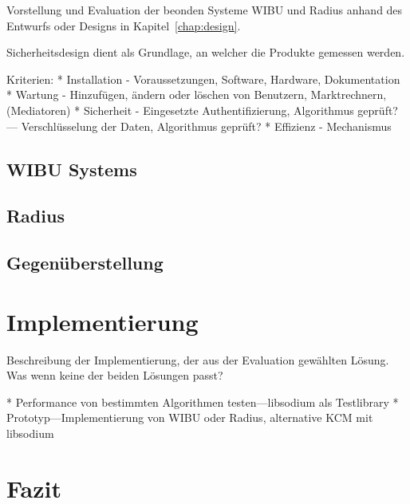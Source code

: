 \documentclass[11pt,a4paper]{report}
\begin{document}
Vorstellung und Evaluation der beonden Systeme WIBU und Radius anhand des Entwurfs oder Designs in Kapitel~\ref{chap:design}.

Sicherheitsdesign dient als Grundlage, an welcher die Produkte gemessen werden.

Kriterien:
* Installation - Voraussetzungen, Software, Hardware, Dokumentation
* Wartung - Hinzufügen, ändern oder löschen von Benutzern, Marktrechnern, (Mediatoren)
* Sicherheit - Eingesetzte Authentifizierung, Algorithmus geprüft? --- Verschlüsselung der Daten, Algorithmus geprüft?
* Effizienz - Mechanismus 
                                            
\section{WIBU Systems}

\section{Radius}

\section{Gegenüberstellung}

\chapter{Implementierung} \label{chap:implementation}

Beschreibung der Implementierung, der aus der Evaluation gewählten Lösung. Was wenn keine der beiden Lösungen passt?

* Performance von bestimmten Algorithmen testen---libsodium als Testlibrary 
* Prototyp---Implementierung von WIBU oder Radius, alternative KCM mit libsodium

\chapter{Fazit}
\end{document}
